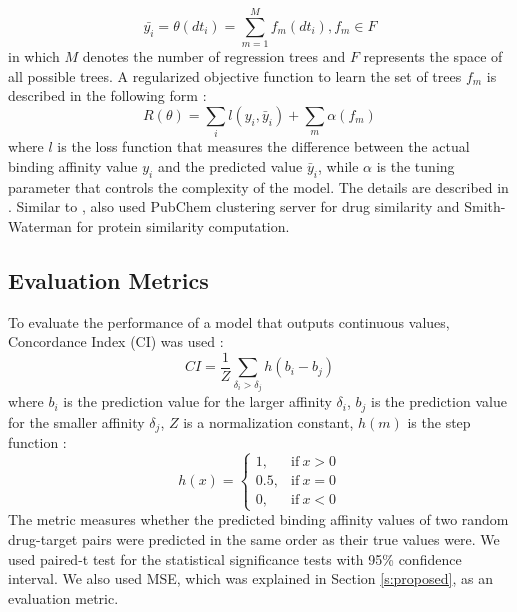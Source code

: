 \documentclass[11pt,letterpaper]{article}
\begin{document}
\begin{equation}\label{e:simboost}
\bar{y_i} =  \theta(dt_i)=\sum_{m=1}^M {f_m(dt_i)}, f_m\in F
\end{equation}
in which $M$ denotes the number of regression trees and $F$ represents the space of all possible trees.  A regularized objective function to learn the set of trees ${f_m}$ is described in the following form \cite{he2017simboost}:
\begin{equation}\label{e:simboosto}
R(\theta) = \sum_{i} {l(y_i, \bar{y}_i)} +  \sum_{m} \alpha (f_m)
\end{equation}
where $l$ is the loss function that measures the difference between the actual binding affinity value $y_i$ and the predicted value $\bar{y}_i$, while $\alpha$ is the tuning parameter that controls the complexity of the model. The details are described in \cite{he2017simboost,chen2015higgs,chen2016xgboost}. Similar to  \cite{pahikkala2014toward}, \cite{he2017simboost} also used PubChem clustering server for drug similarity and Smith-Waterman for protein similarity computation.


\subsection*{Evaluation Metrics}

To evaluate the performance of a model that outputs continuous values, Concordance Index (CI) was used \cite{gonen2005concordance}:
\begin{equation}
CI = \frac {1} {Z} \sum_{\delta_i > \delta_j} h (b_i - b_j)
\end{equation}
where $b_i$ is the prediction value for the larger affinity $\delta_i$, $b_j$ is the prediction value for the smaller affinity $\delta_j$, $Z$ is a normalization constant, $h(m)$ is the step function \cite{pahikkala2014toward}:
\begin{equation}
   h(x) = 
\begin{cases} 
          1,  & \text{if}\ x > 0\\
         0.5,  & \text{if}\ x= 0\\
	   0, & \text{if}\ x <0 
 \end{cases}                                          
 \end{equation}
The metric measures whether the predicted binding affinity values of two random drug-target pairs were predicted in the same order as their true values were. We used paired-t test for the statistical significance tests with 95\% confidence interval. We also used MSE, which was explained in Section \ref{s:proposed}, as an evaluation metric.
\end{document}

